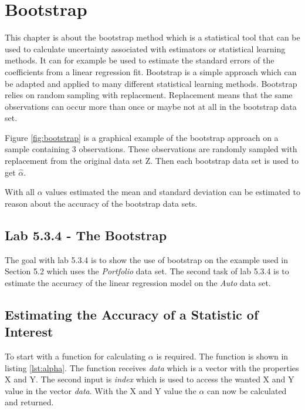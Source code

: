 \section{Bootstrap}
This chapter is about the bootstrap method which is a statistical tool that can be used to calculate uncertainty associated with estimators or statistical learning methods. It can for example be used to estimate the standard errors of the coefficients from a linear regression fit. Bootstrap is a simple approach which can be adapted and applied to many different statistical learning methods. Bootstrap relies on random sampling with replacement. Replacement means that the same observations can occur more than once or maybe not at all in the bootstrap data set. 


Figure \ref{fig:bootstrap} is a graphical example of the bootstrap approach on a sample containing 3 observations. These observations are randomly sampled with replacement from the original data set Z. Then each bootstrap data set is used to get $\hat{\alpha}$.

With all $\alpha$ values estimated the mean and standard deviation can be estimated to reason about the accuracy of the bootstrap data sets.

\subsection{Lab 5.3.4 - The Bootstrap}

The goal with lab 5.3.4 is to show the use of bootstrap on the example used in Section 5.2\citep{ISLR} which uses the \emph{Portfolio} data set. The second task of lab 5.3.4 is to estimate the accuracy of the linear regression model on the \emph{Auto} data set.

\subsection{Estimating the Accuracy of a Statistic of Interest}

To start with a function for calculating $\alpha$ is required. The function is shown in listing \ref{lst:alpha}. The function receives \emph{data} which is a vector with the properties X and Y. The second input is \emph{index} which is used to access the wanted X and Y value in the vector \emph{data}.
With the X and Y value the $\alpha$ can now be calculated and returned.


